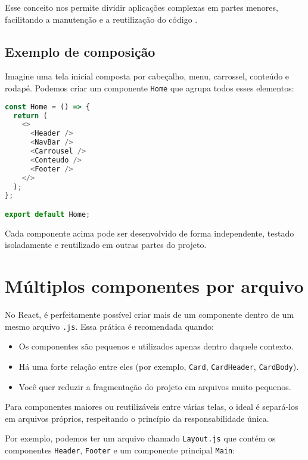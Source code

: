 Esse conceito nos permite dividir aplicações complexas em partes menores, facilitando a manutenção e a reutilização do código \cite{devtoComponentes, reactDocsComponents}.

\subsection*{Exemplo de composição}

Imagine uma tela inicial composta por cabeçalho, menu, carrossel, conteúdo e rodapé. Podemos criar um componente \texttt{Home} que agrupa todos esses elementos:

\begin{lstlisting}[language=JavaScript, caption={Composição de componentes}]
const Home = () => {
  return (
    <>
      <Header />
      <NavBar />
      <Carrousel />
      <Conteudo />
      <Footer />
    </>
  );
};

export default Home;
\end{lstlisting}

Cada componente acima pode ser desenvolvido de forma independente, testado isoladamente e reutilizado em outras partes do projeto.


\section{Múltiplos componentes por arquivo}

No React, é perfeitamente possível criar mais de um componente dentro de um mesmo arquivo \texttt{.js}. Essa prática é recomendada quando:

\begin{itemize}
  \item Os componentes são pequenos e utilizados apenas dentro daquele contexto.
  \item Há uma forte relação entre eles (por exemplo, \texttt{Card}, \texttt{CardHeader}, \texttt{CardBody}).
  \item Você quer reduzir a fragmentação do projeto em arquivos muito pequenos.
\end{itemize}

Para componentes maiores ou reutilizáveis entre várias telas, o ideal é separá-los em arquivos próprios, respeitando o princípio da responsabilidade única.


Por exemplo, podemos ter um arquivo chamado \texttt{Layout.js} que contém os componentes \texttt{Header}, \texttt{Footer} e um componente principal \texttt{Main}:

